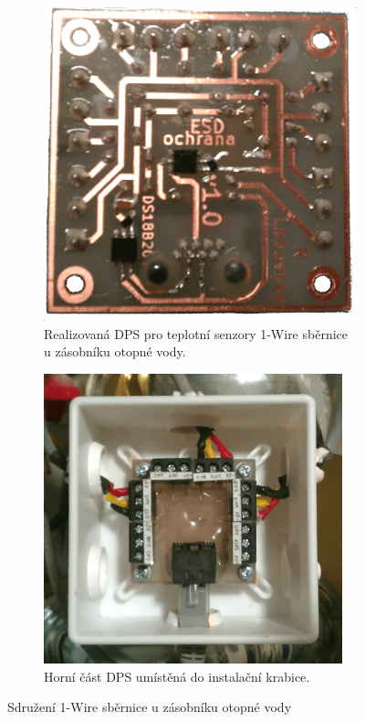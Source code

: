 \begin{figure}[H]
\centering
\begin{subfigure}{.5\textwidth}
    \centering
    \includegraphics[width=\textwidth]{images/zasobnik-otopne-vody/dps-1-wire-sbernice-u-zasobniku-otopne-vody.png}
    \caption{Realizovaná DPS pro teplotní senzory 1-Wire sběrnice u zásobníku otopné vody.}
    \label{fig:dps-1-wire-sbernice-u-zasobniku-otopne-vody}
\end{subfigure}%
\begin{subfigure}{.5\textwidth}
   	\centering
    \includegraphics[width=0.95\textwidth]{images/zasobnik-otopne-vody/instalacni-krabice-cidla-u-zasobniku-otopne-vody.png}
    \caption{Horní část DPS umístěná do instalační krabice.}
    \label{fig:instalacni-krabice-cidla-u-zasobniku-otopne-vody}
\end{subfigure}%
\caption{Sdružení 1-Wire sběrnice u zásobníku otopné vody}
\end{figure}

